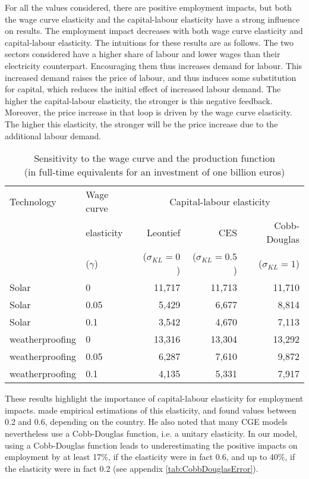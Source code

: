 For all the values considered, there are positive employment impacts, but both the wage curve elasticity and the capital-labour elasticity have a strong influence on results. The employment impact decreases with both wage curve elasticity and capital-labour elasticity.
The intuitions for these results are as follows. The two sectors considered have a higher share of labour and lower wages than their electricity counterpart. Encouraging them thus increases demand for labour. This increased demand raises the price of labour, and thus induces some substitution for capital, which reduces the initial effect of increased labour demand. The higher the capital-labour elasticity, the stronger is this negative feedback.
Moreover, the price increase in that loop is driven by the wage curve elasticity. The higher this elasticity, the stronger will be the price increase due to the additional labour demand. 

\begin{table}[!h]
	\centering
	\caption{Sensitivity to the wage curve and the production function \\ (in full-time equivalents for an investment of one billion euros)}
	\label{tab:wageCurve}
	\begin{tabular}{ll|rrr}
		\toprule
		Technology & Wage curve & \multicolumn{3}{c}{Capital-labour elasticity} \\
		& elasticity      & Leontief & CES & Cobb-Douglas \\
		&	($\gamma$)  &($\sigma_{KL}=0$) & ($\sigma_{KL}=0.5$) & ($\sigma_{KL}=1$) \\
		\midrule
		Solar & 0 & 11,717 & 11,713 & 11,710 \\
		Solar & 0.05 & 5,429 & 6,677 & 8,814 \\
		Solar & 0.1 & 3,542 & 4,670 & 7,113 \\
		\midrule
		weatherproofing & 0 & 13,316 & 13,304 & 13,292 \\
		weatherproofing & 0.05 & 6,287 & 7,610 & 9,872 \\
		weatherproofing & 0.1 & 4,135 & 5,331 & 7,917 \\
		\bottomrule
	\end{tabular}
\end{table}

These results highlight the importance of capital-labour elasticity for employment impacts. 
\citet{VanderWerf2008} made empirical estimations of this elasticity, and found values between 0.2 and 0.6, depending on the country.  He also noted that many CGE models nevertheless use a Cobb-Douglas function, i.e. a unitary elasticity. In our model, using a Cobb-Douglas function leads to underestimating the positive impacts on employment by at least 17\%, if the elasticity were in fact 0.6, and up to 40\%, if the elasticity were in fact 0.2 (see appendix \ref{tab:CobbDouglasError}).

